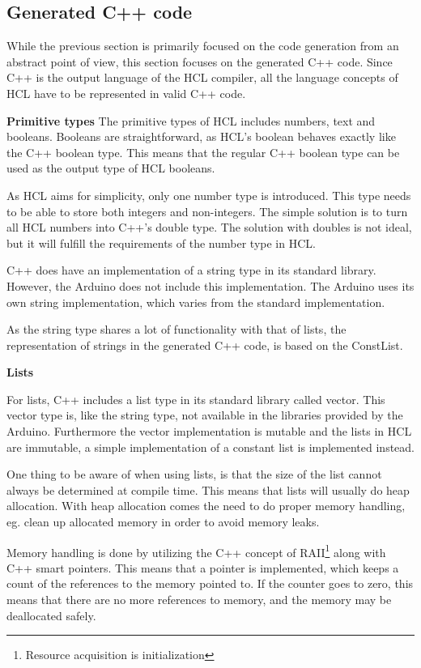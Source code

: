 
\subsection{Generated C++ code}
While the previous section is primarily focused on the code generation from an abstract point of view, this section focuses on the generated C++ code.
Since C++ is the output language of the HCL compiler, all the language concepts of HCL have to be represented in valid C++ code.

\textbf{Primitive types}
The primitive types of HCL includes numbers, text and booleans. 
Booleans are straightforward, as HCL's boolean behaves exactly like the C++ boolean type.
This means that the regular C++ boolean type can be used as the output type of HCL booleans.

As HCL aims for simplicity, only one number type is introduced. 
This type needs to be able to store both integers and non-integers. 
The simple solution is to turn all HCL numbers into C++'s double type.
The solution with doubles is not ideal, but it will fulfill the requirements of the number type in HCL.

C++ does have an implementation of a string type in its standard library.
However, the Arduino does not include this implementation.
The Arduino uses its own string implementation, which varies from the standard implementation.

As the string type shares a lot of functionality with that of lists, the representation of strings in the generated C++ code, is based on the ConstList.

\textbf{Lists}

For lists, C++ includes a list type in its standard library called vector. 
This vector type is, like the string type, not available in the libraries provided by the Arduino.
Furthermore the vector implementation is mutable and the lists in HCL are immutable, a simple implementation of a constant list is implemented instead.

One thing to be aware of when using lists, is that the size of the list cannot always be determined at compile time.
This means that lists will usually do heap allocation. 
With heap allocation comes the need to do proper memory handling, eg.
clean up allocated memory in order to avoid memory leaks.

Memory handling is done by utilizing the C++ concept of RAII\footnote{Resource acquisition is initialization} along with C++ smart pointers.
This means that a pointer is implemented, which keeps a count of the references to the memory pointed to.
If the counter goes to zero, this means that there are no more references to memory, and the memory may be deallocated safely.

